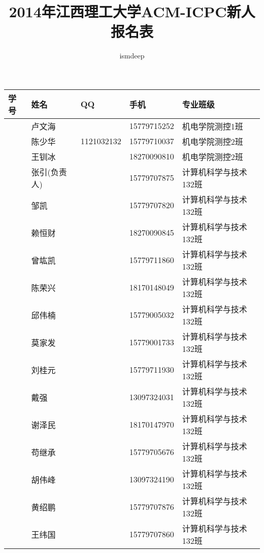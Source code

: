 \documentclass[12pt,a4paper]{article}
\begin{document}
\begin{CJK}{UTF8}{gbsn}
\title{2014年江西理工大学ACM-ICPC新人报名表}
\author{ismdeep}
\date{}


\maketitle


\begin{flushleft}


\begin{longtable}{|l|l|l|l|l|}\hline

学号 & 姓名 & QQ & 手机 & 专业班级 \\ \hline

& 卢文海 && 15779715252 &机电学院测控1班 \\ \hline
           & 陈少华 & 1121032132 & 15779710037 & 机电学院测控2班  \\ \hline
           & 王钏冰 &  & 18270090810 & 机电学院测控2班  \\ \hline
           & 张引(负责人) &  & 15779707875  & 计算机科学与技术132班  \\ \hline
           & 邹凯   &  & 15779707820 & 计算机科学与技术132班  \\ \hline
           & 赖恒财 &    & 18270090845 & 计算机科学与技术132班 \\ \hline
           & 曾竑凯 &    & 15779711860 & 计算机科学与技术132班 \\ \hline
           & 陈荣兴 &    & 18170148049 & 计算机科学与技术132班 \\ \hline
           & 邱伟楠 &    & 15779005032 & 计算机科学与技术132班 \\ \hline
           & 莫家发 &    & 15779001733 & 计算机科学与技术132班 \\ \hline
           & 刘桂元 &    & 15779711930 & 计算机科学与技术132班 \\ \hline
           & 戴强   &    & 13097324031 & 计算机科学与技术132班 \\ \hline
           & 谢泽民 &    & 18170147970 & 计算机科学与技术132班 \\ \hline
           & 苟继承 &    & 15779705676 & 计算机科学与技术132班 \\ \hline
           & 胡伟峰 &    & 13097324190 & 计算机科学与技术132班 \\ \hline
           & 黄绍鹏 &    & 15779707876 & 计算机科学与技术132班 \\ \hline
           & 王纬国 &    & 15779707860 & 计算机科学与技术132班 \\ \hline


\end{longtable}
\end{flushleft}
\end{CJK}
\end{document}

